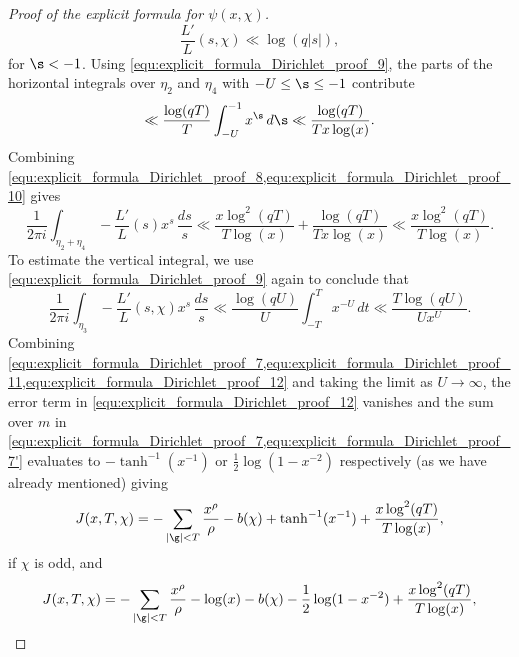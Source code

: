\begin{proof}[Proof of the explicit formula for \(\psi(x,\chi)\)]
      \begin{equation}\label{equ:explicit_formula_Dirichlet_proof_9}
        \frac{L'}{L}(s,\chi) \ll \log(q|s|),
      \end{equation}
      for \(\s < -1\). Using \cref{equ:explicit_formula_Dirichlet_proof_9}, the parts of the horizontal integrals over \(\eta_{2}\) and \(\eta_{4}\) with \(-U \le \s \le -1\) contribute
      \begin{equation}\label{equ:explicit_formula_Dirichlet_proof_10}
        \ll \frac{\log(qT)}{T}\int_{-U}^{-1}x^{\s}\,d\s \ll \frac{\log(qT)}{Tx\log(x)}.
      \end{equation}
      Combining \cref{equ:explicit_formula_Dirichlet_proof_8,equ:explicit_formula_Dirichlet_proof_10} gives
      \begin{equation}\label{equ:explicit_formula_Dirichlet_proof_11}
        \frac{1}{2\pi i}\int_{\eta_{2}+\eta_{4}}-\frac{L'}{L}(s)x^{s}\,\frac{ds}{s} \ll \frac{x\log^{2}(qT)}{T\log(x)}+\frac{\log(qT)}{Tx\log(x)} \ll \frac{x\log^{2}(qT)}{T\log(x)}.
      \end{equation}
      To estimate the vertical integral, we use \cref{equ:explicit_formula_Dirichlet_proof_9} again to conclude that
      \begin{equation}\label{equ:explicit_formula_Dirichlet_proof_12}
        \frac{1}{2\pi i}\int_{\eta_{3}}-\frac{L'}{L}(s,\chi)x^{s}\,\frac{ds}{s} \ll \frac{\log(qU)}{U}\int_{-T}^{T}x^{-U}\,dt \ll \frac{T\log(qU)}{Ux^{U}}.
      \end{equation}
      Combining \cref{equ:explicit_formula_Dirichlet_proof_7,equ:explicit_formula_Dirichlet_proof_11,equ:explicit_formula_Dirichlet_proof_12} and taking the limit as \(U \to \infty\), the error term in \cref{equ:explicit_formula_Dirichlet_proof_12} vanishes and the sum over \(m\) in \cref{equ:explicit_formula_Dirichlet_proof_7,equ:explicit_formula_Dirichlet_proof_7'} evaluates to \(-\tanh^{-1}(x^{-1})\) or \(\frac{1}{2}\log(1-x^{-2})\) respectively (as we have already mentioned) giving
      \begin{equation}\label{equ:explicit_formula_Dirichlet_proof_13}
        J(x,T,\chi) = -\sum_{|\g| < T}\frac{x^{\rho}}{\rho}-b(\chi)+\tanh^{-1}(x^{-1})+\frac{x\log^{2}(qT)}{T\log(x)},
      \end{equation}
      if \(\chi\) is odd, and
      \begin{equation}\label{equ:explicit_formula_Dirichlet_proof_13'}
        J(x,T,\chi) = -\sum_{|\g| < T}\frac{x^{\rho}}{\rho}-\log(x)-b(\chi)-\frac{1}{2}\log(1-x^{-2})+\frac{x\log^{2}(qT)}{T\log(x)},

\end{equation}
\end{proof}
